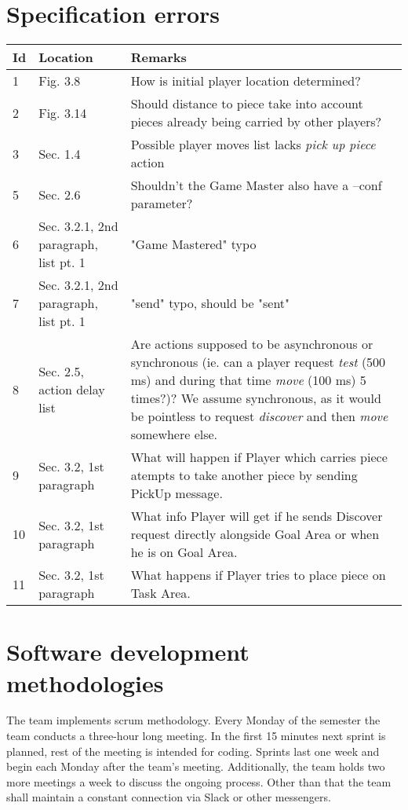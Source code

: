 \documentclass[11pt,a4paper]{article}
\begin{document}
\section{Specification errors}
\begin{longtable}{|p{}|p{}|p{}|}
\hline
\textbf{Id}
& \textbf{Location}
& \textbf{Remarks}
\\ \hline
1
& Fig. 3.8
& How is initial player location determined?
\\ \hline
2
& Fig. 3.14
& Should distance to piece take into account pieces already being carried by other players?
\\ \hline
3
& Sec. 1.4
& Possible player moves list lacks \textit{pick up piece} action
\\ \hline
5
& Sec. 2.6
& Shouldn't the Game Master also have a --conf parameter?
\\ \hline
6
& Sec. 3.2.1, 2nd paragraph, list pt. 1
& "Game Mastered" typo
\\ \hline
7
& Sec. 3.2.1, 2nd paragraph, list pt. 1
& "send" typo, should be "sent"
\\ \hline
8
& Sec. 2.5, action delay list
& Are actions supposed to be asynchronous or synchronous (ie. can a player request \textit{test} (500 ms) and during that time \textit{move} (100 ms) 5 times?)? We assume synchronous, as it would be pointless to request \textit{discover} and then \textit{move} somewhere else.
\\ \hline
9
& Sec. 3.2, 1st paragraph
& What will happen if Player which carries piece atempts to take another piece by sending PickUp message.
\\ \hline
10
& Sec. 3.2, 1st paragraph
& What info Player will get if he sends Discover request directly alongside Goal Area or when he is on Goal Area.
\\ \hline
11
& Sec. 3.2, 1st paragraph
& What happens if Player tries to place piece on Task Area.
\\ \hline


\end{longtable}

\section{Software development methodologies}
The team implements scrum methodology. Every Monday of the semester the team conducts a three-hour long meeting. In the first 15 minutes next sprint is planned, rest of the meeting is intended for coding. Sprints last one week and begin each Monday after the team's meeting. Additionally, the team holds two more meetings a week to discuss the ongoing process. Other than that the team shall maintain a constant connection via Slack or other messengers.
\end{document}
